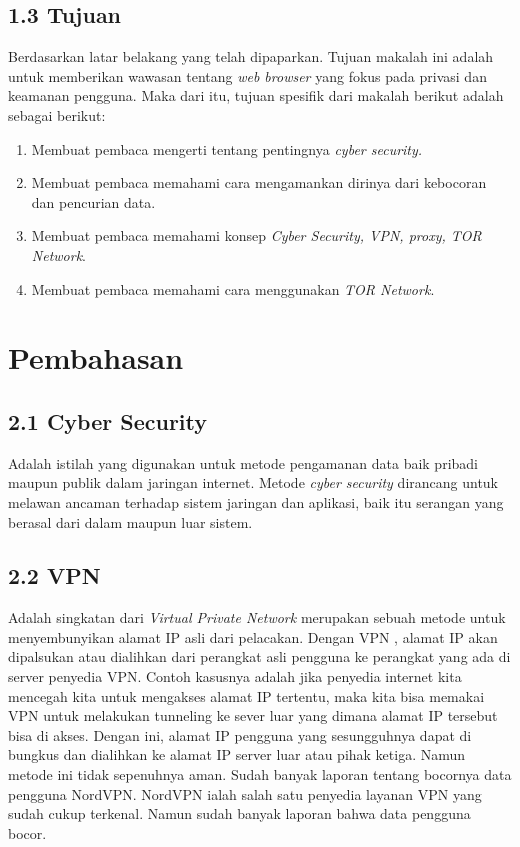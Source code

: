\documentclass{article}
\begin{document}
        \subsection*{1.3 Tujuan}
        \noindent Berdasarkan latar belakang yang telah dipaparkan. Tujuan makalah ini adalah
        untuk memberikan wawasan tentang \textit{web browser} yang fokus pada 
        privasi dan keamanan pengguna. Maka dari itu, tujuan spesifik dari makalah
        berikut adalah sebagai berikut:
        \begin{enumerate}
            \item Membuat pembaca mengerti tentang pentingnya \textit{cyber security.}
            \item Membuat pembaca memahami cara mengamankan dirinya dari kebocoran dan pencurian data.
            \item Membuat pembaca memahami konsep \textit{Cyber Security, VPN, proxy, TOR Network}.
            \item Membuat pembaca memahami cara menggunakan \textit{TOR Network}. 
        \end{enumerate}
       
        \section{Pembahasan}
        \subsection*{2.1 Cyber Security}
        \noindent Adalah istilah yang digunakan untuk metode pengamanan data baik pribadi
        maupun publik dalam jaringan internet. Metode \textit{cyber security}
        dirancang untuk melawan ancaman terhadap sistem jaringan dan aplikasi,
        baik itu serangan yang berasal dari dalam maupun luar sistem.
        \subsection*{2.2 VPN}
        Adalah singkatan dari \textit{Virtual Private Network} merupakan
        sebuah metode untuk menyembunyikan alamat IP asli dari pelacakan. Dengan VPN
        , alamat IP akan dipalsukan atau dialihkan dari perangkat asli pengguna
        ke perangkat yang ada di server penyedia VPN. Contoh kasusnya
        adalah jika penyedia internet kita mencegah kita untuk mengakses
        alamat IP tertentu, maka kita bisa memakai VPN untuk melakukan 
        tunneling ke sever luar yang dimana alamat IP tersebut bisa di akses.
        Dengan ini, alamat IP pengguna yang sesungguhnya dapat di bungkus
        dan dialihkan ke alamat IP server luar atau pihak ketiga.
        Namun metode ini tidak sepenuhnya aman. Sudah banyak laporan tentang
        bocornya data pengguna NordVPN. NordVPN ialah salah satu 
        penyedia layanan VPN yang sudah cukup terkenal. Namun sudah banyak
        laporan bahwa data pengguna bocor.
\end{document}

